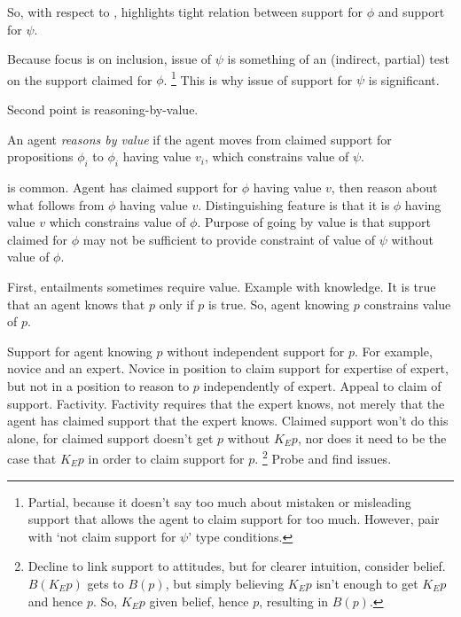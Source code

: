 \begin{note}
  So, with respect to \nI{}, \incl{} highlights tight relation between support for \(\phi\) and support for \(\psi\).

  Because focus is on inclusion, issue of \(\psi\) is something of an (indirect, partial) test on the support claimed for \(\phi\).\nolinebreak
  \footnote{
    Partial, because it doesn't say too much about mistaken or misleading support that allows the agent to claim support for too much.
    However, pair with `not claim support for \(\psi\)' type conditions.
  }
  This is why issue of support for \(\psi\) is significant.
\end{note}


\begin{note}[\RBV{}]
  Second point is reasoning-by-value.

  \begin{proposition}
    An agent \emph{reasons by value} if the agent moves from claimed support for propositions \(\phi_{i}\) to \(\phi_{i}\) having value \(v_{i}\), which constrains value of \(\psi\).
  \end{proposition}

  \RBV{} is common.
  Agent has claimed support for \(\phi\) having value \(v\), then reason about what follows from \(\phi\) having value \(v\).
  Distinguishing feature is that it is \(\phi\) having value \(v\) which constrains value of \(\phi\).
  Purpose of going by value is that support claimed for \(\phi\) may not be sufficient to provide constraint of value of \(\psi\) without value of \(\phi\).

  First, entailments sometimes require value.
  Example with knowledge.
  It is true that an agent knows that \(p\) only if \(p\) is true.
  So, agent knowing \(p\) constrains value of \(p\).

  Support for agent knowing \(p\) without independent support for \(p\).
  For example, novice and an expert.
  Novice in position to claim support for expertise of expert, but not in a position to reason to \(p\) independently of expert.
  Appeal to claim of support.
  Factivity.
  Factivity requires that the expert knows, not merely that the agent has claimed support that the expert knows.
  Claimed support won't do this alone, for claimed support doesn't get \(p\) without \(K_{E}p\), nor does it need to be the case that \(K_{E}p\) in order to claim support for \(p\).\nolinebreak
  \footnote{
    Decline to link support to attitudes, but for clearer intuition, consider belief.
    \(B(K_{E}p)\) gets to \(B(p)\), but simply believing \(K_{E}p\) isn't enough to get \(K_{E}p\) and hence \(p\).
    So, \(K_{E}p\) given belief, hence \(p\), resulting in \(B(p)\).
  }
  Probe and find issues.


\end{note}
